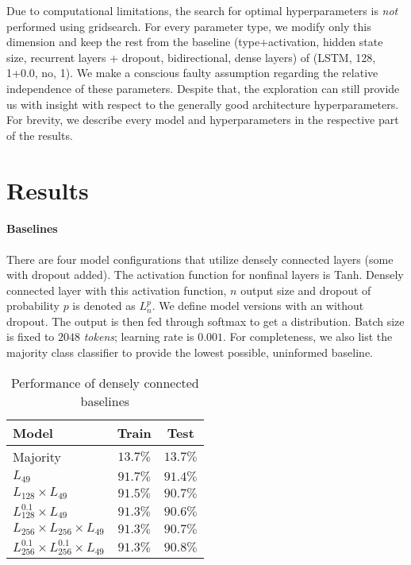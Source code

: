 \documentclass[11pt,a4paper]{article}
\begin{document}
Due to computational limitations, the search for optimal hyperparameters is \textit{not} performed using gridsearch. For every parameter type, we modify only this dimension and keep the rest from the baseline (type+activation, hidden state size, recurrent layers + dropout, bidirectional, dense layers) of (LSTM, 128, 1+0.0, no, 1). We make a conscious faulty assumption regarding the relative independence of these parameters. Despite that, the exploration can still provide us with insight with respect to the generally good architecture hyperparameters.
For brevity, we describe every model and hyperparameters in the respective part of the results.

\section{Results}

\paragraph{Baselines} 
There are four model configurations that utilize densely connected layers (some with dropout added). The activation function for nonfinal layers is Tanh. Densely connected layer with this activation function, $n$ output size and dropout of probability $p$ is denoted as $L_n^p$. We define model versions with an without dropout. The output is then fed through softmax to get a distribution. Batch size is fixed to $2048$ \textit{tokens}; learning rate is $0.001$.
For completeness, we also list the majority class classifier to provide the lowest possible, uninformed baseline.

\begin{table}[ht]
    \centering
    \begin{tabular}{lcc}
    \toprule
    Model & Train & Test \\
    \midrule
    Majority & $13.7\%$ & $13.7\%$ \\
    $L_{49}$\dag{} & $91.7\%$ & $91.4\%$ \\
    $L_{128} \times L_{49}$ & $91.5\%$ & $90.7\%$ \\
    $L_{128}^{0.1} \times L_{49}$ & $91.3\%$ & $90.6\%$ \\
    $L_{256} \times L_{256} \times L_{49}$ & $91.3\%$ & $90.7\%$ \\
    $L_{256}^{0.1} \times L_{256}^{0.1} \times L_{49}$ & $91.3\%$ & $90.8\%$ \\
    \bottomrule
    \end{tabular}
    \caption{\label{tab:baselines} Performance of densely connected baselines}
\end{table}
\end{document}
